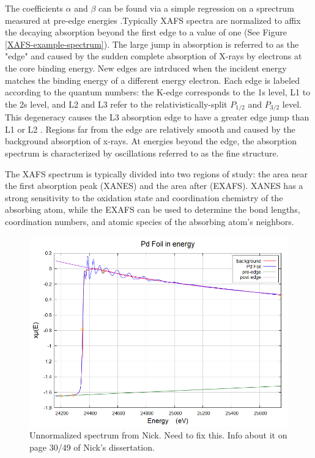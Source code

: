 \noindent The coefficients $ \alpha $ and $ \beta $ can be found via a simple regression on a sprectrum measured at pre-edge energies \cite{klementev2000xafs}.Typically XAFS spectra are normalized to affix the decaying absorption beyond the first edge to a value of one (See Figure \ref{XAFS-example-spectrum}). The large jump in absorption is referred to as the "edge" and caused by the sudden complete absorption of X-rays by electrons at the core binding energy. New edges are intrduced when the incident energy matches the binding energy of a different energy electron. Each edge is labeled according to the quantum numbers: the K-edge corresponds to the 1s level, L1 to the 2s level, and L2 and L3 refer to the relativistically-split $ P_{1/2} $  and $ P_{3/2} $ level. This degeneracy causes the L3 absorption edge to have a greater edge jump than L1 or L2 \cite{absorptionSpecArticle}. Regions far from the edge are relatively smooth and caused by the background absorption of x-rays. At energies beyond the edge, the absorption spectrum is characterized by oscillations referred to as the fine structure.

The XAFS spectrum is typically divided into two regions of study: the area near the first absorption peak (XANES) and the area after (EXAFS). XANES has a strong sensitivity to the oxidation state and coordination chemistry of the absorbing atom, while the EXAFS can be used to determine the bond lengths, coordination numbers, and atomic species of the absorbing atom's neighbors.

\begin{figure}
    \centering
    \includegraphics[width=.75\linewidth]{Chapters/Figures/un-normalized-xafs.png}
    \caption{Unnormalized spectrum from Nick. Need to fix this. Info about it on page 30/49 of Nick's dissertation.}
    \label{fig:Unnormalized-XAFS}
\end{figure}

